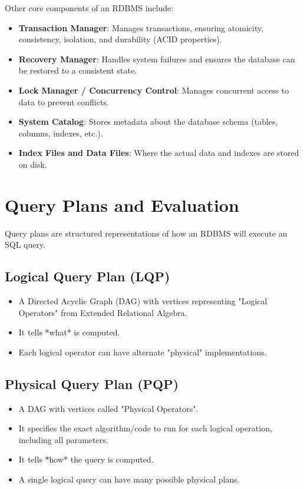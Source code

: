 \documentclass{article}
\begin{document}
Other core components of an RDBMS include:
\begin{itemize}
    \item \textbf{Transaction Manager}: Manages transactions, ensuring atomicity, consistency, isolation, and durability (ACID properties).
    \item \textbf{Recovery Manager}: Handles system failures and ensures the database can be restored to a consistent state.
    \item \textbf{Lock Manager / Concurrency Control}: Manages concurrent access to data to prevent conflicts.
    \item \textbf{System Catalog}: Stores metadata about the database schema (tables, columns, indexes, etc.).
    \item \textbf{Index Files and Data Files}: Where the actual data and indexes are stored on disk.
\end{itemize}

\section*{Query Plans and Evaluation}
Query plans are structured representations of how an RDBMS will execute an SQL query.

\subsection*{Logical Query Plan (LQP)}
\begin{itemize}
    \item A Directed Acyclic Graph (DAG) with vertices representing "Logical Operators" from Extended Relational Algebra.
    \item It tells *what* is computed.
    \item Each logical operator can have alternate "physical" implementations.
\end{itemize}

\subsection*{Physical Query Plan (PQP)}
\begin{itemize}
    \item A DAG with vertices called "Physical Operators".
    \item It specifies the exact algorithm/code to run for each logical operation, including all parameters.
    \item It tells *how* the query is computed.
    \item A single logical query can have many possible physical plans.
\end{itemize}
\end{document}
